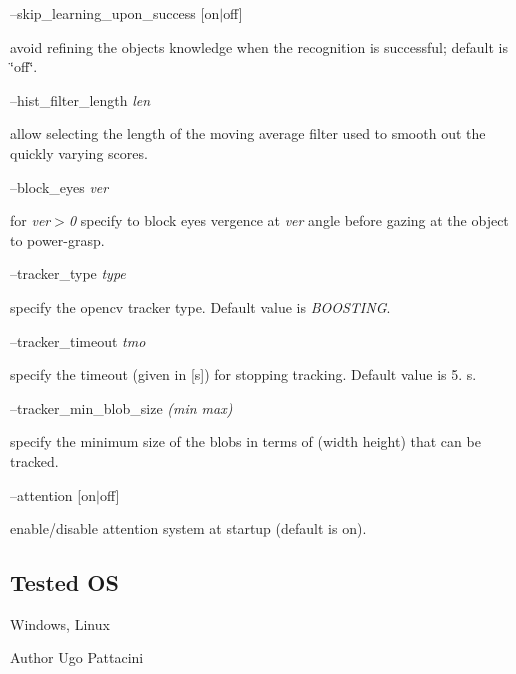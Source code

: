 --skip\+\_\+learning\+\_\+upon\+\_\+success {\itshape }\mbox{[}on$\vert$off\mbox{]}
\begin{DoxyItemize}
\item avoid refining the objects knowledge when the recognition is successful; default is \char`\"{}off\char`\"{}.
\end{DoxyItemize}

--hist\+\_\+filter\+\_\+length {\itshape len} 
\begin{DoxyItemize}
\item allow selecting the length of the moving average filter used to smooth out the quickly varying scores.
\end{DoxyItemize}

--block\+\_\+eyes {\itshape ver} 
\begin{DoxyItemize}
\item for {\itshape ver$>$0} specify to block eyes vergence at {\itshape ver} angle before gazing at the object to power-\/grasp.
\end{DoxyItemize}

--tracker\+\_\+type {\itshape type} 
\begin{DoxyItemize}
\item specify the opencv tracker type. Default value is {\itshape B\+O\+O\+S\+T\+I\+NG}.
\end{DoxyItemize}

--tracker\+\_\+timeout {\itshape tmo} 
\begin{DoxyItemize}
\item specify the timeout (given in \mbox{[}s\mbox{]}) for stopping tracking. Default value is 5. s.
\end{DoxyItemize}

--tracker\+\_\+min\+\_\+blob\+\_\+size {\itshape (min max)}
\begin{DoxyItemize}
\item specify the minimum size of the blobs in terms of (width height) that can be tracked.
\end{DoxyItemize}

--attention {\itshape }\mbox{[}on$\vert$off\mbox{]}
\begin{DoxyItemize}
\item enable/disable attention system at startup (default is on).
\end{DoxyItemize}\hypertarget{group__icub__iolStateMachineHandler_tested_os_sec}{}\subsection{Tested OS}\label{group__icub__iolStateMachineHandler_tested_os_sec}
Windows, Linux

\begin{DoxyAuthor}{Author}
Ugo Pattacini 
\end{DoxyAuthor}

